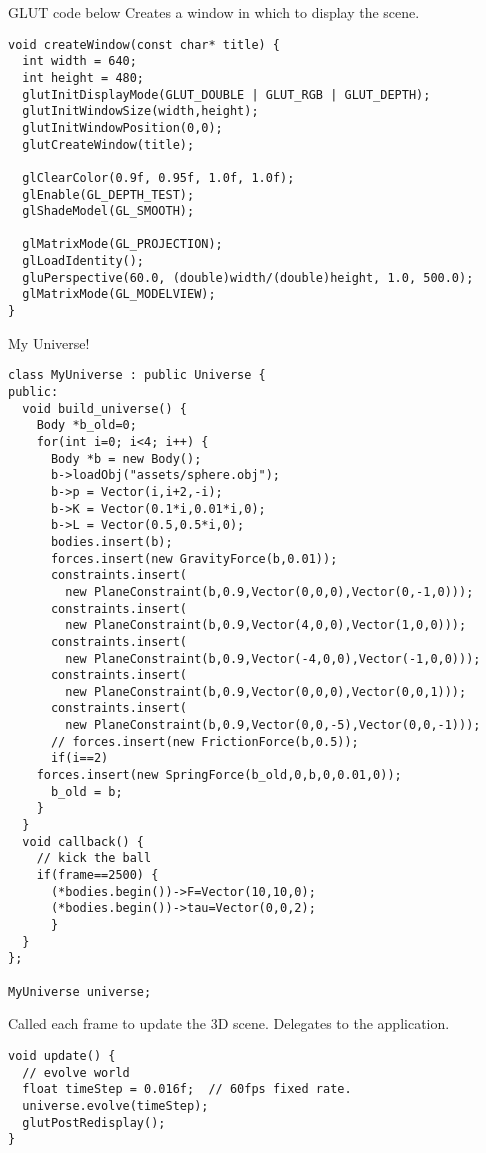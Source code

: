 GLUT code below
Creates a window in which to display the scene.
\begin{lstlisting}
void createWindow(const char* title) {
  int width = 640;
  int height = 480;
  glutInitDisplayMode(GLUT_DOUBLE | GLUT_RGB | GLUT_DEPTH);
  glutInitWindowSize(width,height);
  glutInitWindowPosition(0,0);
  glutCreateWindow(title);
  
  glClearColor(0.9f, 0.95f, 1.0f, 1.0f);
  glEnable(GL_DEPTH_TEST);
  glShadeModel(GL_SMOOTH);
  
  glMatrixMode(GL_PROJECTION);
  glLoadIdentity();
  gluPerspective(60.0, (double)width/(double)height, 1.0, 500.0);
  glMatrixMode(GL_MODELVIEW);
}
\end{lstlisting}

My Universe!
\begin{lstlisting}
class MyUniverse : public Universe {
public:
  void build_universe() {
    Body *b_old=0;
    for(int i=0; i<4; i++) {
      Body *b = new Body();
      b->loadObj("assets/sphere.obj");
      b->p = Vector(i,i+2,-i);
      b->K = Vector(0.1*i,0.01*i,0);
      b->L = Vector(0.5,0.5*i,0);
      bodies.insert(b);
      forces.insert(new GravityForce(b,0.01));
      constraints.insert(
        new PlaneConstraint(b,0.9,Vector(0,0,0),Vector(0,-1,0)));
      constraints.insert(
        new PlaneConstraint(b,0.9,Vector(4,0,0),Vector(1,0,0)));
      constraints.insert(
        new PlaneConstraint(b,0.9,Vector(-4,0,0),Vector(-1,0,0)));
      constraints.insert(
        new PlaneConstraint(b,0.9,Vector(0,0,0),Vector(0,0,1)));
      constraints.insert(
        new PlaneConstraint(b,0.9,Vector(0,0,-5),Vector(0,0,-1)));
      // forces.insert(new FrictionForce(b,0.5));
      if(i==2)
	forces.insert(new SpringForce(b_old,0,b,0,0.01,0));
      b_old = b;
    }
  }
  void callback() {
    // kick the ball
    if(frame==2500) {
      (*bodies.begin())->F=Vector(10,10,0);
      (*bodies.begin())->tau=Vector(0,0,2);
      }
  }
};

MyUniverse universe;
\end{lstlisting}

Called each frame to update the 3D scene. Delegates to
the application.
\begin{lstlisting}
void update() {
  // evolve world
  float timeStep = 0.016f;	// 60fps fixed rate.
  universe.evolve(timeStep);
  glutPostRedisplay();
}
\end{lstlisting}

